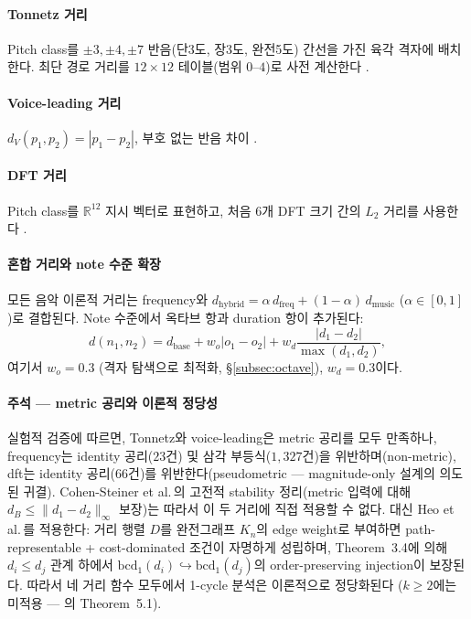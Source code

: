 \documentclass[conference,10pt,a4paper]{IEEEtran}
\begin{document}
\paragraph{Tonnetz 거리}
Pitch class를 $\pm 3, \pm 4, \pm 7$ 반음(단3도, 장3도, 완전5도)
간선을 가진 육각 격자에 배치한다.
최단 경로 거리를 $12 \times 12$ 테이블(범위 $0$--$4$)로 사전
계산한다 \cite{tymoczko2012}.

\paragraph{Voice-leading 거리}
$d_V(p_1, p_2) = |p_1 - p_2|$, 부호 없는 반음 차이
\cite{tymoczko2008}.

\paragraph{DFT 거리}
Pitch class를 $\mathbb{R}^{12}$ 지시 벡터로 표현하고,
처음 6개 DFT 크기 간의 $L_2$ 거리를 사용한다 \cite{tymoczko2008}.

\paragraph{혼합 거리와 note 수준 확장}
모든 음악 이론적 거리는 frequency와
$d_{\mathrm{hybrid}} = \alpha\, d_{\mathrm{freq}} + (1-\alpha)\, d_{\mathrm{music}}$
($\alpha \in [0,1]$)로 결합된다. Note 수준에서 옥타브 항과
duration 항이 추가된다:
\begin{equation}
d(n_1, n_2) = d_{\mathrm{base}} + w_o |o_1 - o_2| + w_d \frac{|d_1 - d_2|}{\max(d_1, d_2)},
\end{equation}
여기서 $w_o = 0.3$ (격자 탐색으로 최적화, \S\ref{subsec:octave}),
$w_d = 0.3$이다.

\paragraph{주석 --- metric 공리와 이론적 정당성}
\label{para:metric_axioms}
실험적 검증에 따르면, Tonnetz와 voice-leading은 metric 공리를 모두 만족하나,
frequency는 identity 공리($23$건) 및 삼각 부등식($1{,}327$건)을 위반하며(non-metric),
dft는 identity 공리($66$건)를 위반한다(pseudometric --- magnitude-only 설계의 의도된 귀결).
Cohen-Steiner et al.\,\cite{cohensteiner2007}의 고전적 stability 정리(metric 입력에 대해
$d_B \le \|d_1-d_2\|_\infty$ 보장)는 따라서 이 두 거리에 직접 적용할 수 없다.
대신 Heo et al.\,\cite{heo2025}를 적용한다:
거리 행렬 $D$를 완전그래프 $K_n$의 edge weight로 부여하면 path-representable +
cost-dominated 조건이 자명하게 성립하며, Theorem~3.4에 의해
$d_i \le d_j$ 관계 하에서 $\mathrm{bcd}_1(d_i)\hookrightarrow\mathrm{bcd}_1(d_j)$의
order-preserving injection이 보장된다.
따라서 네 거리 함수 모두에서 1-cycle 분석은 이론적으로 정당화된다
($k \ge 2$에는 미적용 --- \cite{heo2025}의 Theorem~5.1).
\end{document}

